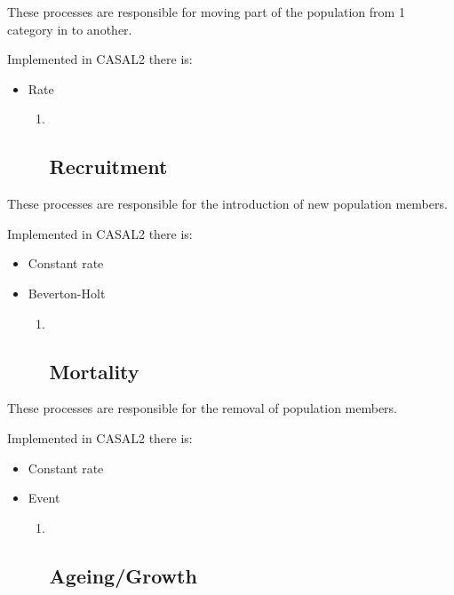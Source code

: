 \documentclass[a4paper,11pt,twoside,pdftex,draft]{article}
\begin{document}
These processes are responsible for moving part of the population from 1
category in to another.

Implemented in CASAL2 there is:

\begin{itemize}
\item
  Rate

  \begin{enumerate}
  \item ~
    \hypertarget{recruitment}{%
    \subsection{Recruitment}\label{recruitment}}
  \end{enumerate}
\end{itemize}

These processes are responsible for the introduction of new population
members.

Implemented in CASAL2 there is:

\begin{itemize}
\item
  Constant rate
\item
  Beverton-Holt

  \begin{enumerate}
  \item ~
    \hypertarget{mortality}{%
    \subsection{Mortality}\label{mortality}}
  \end{enumerate}
\end{itemize}

These processes are responsible for the removal of population members.

Implemented in CASAL2 there is:

\begin{itemize}
\item
  Constant rate
\item
  Event

  \begin{enumerate}
  \item ~
    \hypertarget{ageinggrowth}{%
    \subsection{Ageing/Growth}\label{ageinggrowth}}
  \end{enumerate}
\end{itemize}
\end{document}
